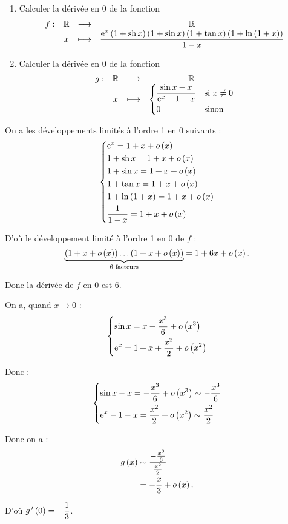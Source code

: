 \begin{exoex}
\begin{enumerate}
    \item Calculer la dérivée en \(0\) de la fonction \[\begin{array}[t]{cccc}f : & \mathbb{R} & \longrightarrow & \mathbb{R} \\ & x & \longmapsto & \dfrac{\mathrm{e}^{x}\left(1+\operatorname{sh} x\right)\left(1+\sin x\right)\left(1+\tan x\right)\left(1+\ln\left(1+x\right)\right)}{1-x}\end{array}\]
    \item Calculer la dérivée en \(0\) de la fonction \[\begin{array}[t]{cccc}g : & \mathbb{R} & \longrightarrow & \mathbb{R} \\ & x & \longmapsto & \begin{dcases}
        \dfrac{\sin x-x}{\mathrm{e}^{x}-1-x} &\text{si }x\not=0 \\
        0 &\text{sinon}
    \end{dcases}\end{array}\]
\end{enumerate}
\end{exoex}

\begin{corr}[1]
On a les développements limités à l'ordre 1 en \(0\) suivants : \[\begin{dcases}
\mathrm{e}^{x}=1+x+o\left(x\right) \\
1+\operatorname{sh} x=1+x+o\left(x\right) \\
1+\sin x=1+x+o\left(x\right) \\
1+\tan x=1+x+o\left(x\right) \\
1+\ln\left(1+x\right)=1+x+o\left(x\right) \\
\dfrac{1}{1-x}=1+x+o\left(x\right)
\end{dcases}\]

D'où le développement limité à l'ordre 1 en \(0\) de \(f\) : \[\underbrace{\left(1+x+o\left(x\right)\right)\dots\left(1+x+o\left(x\right)\right)}_{\text{6 facteurs}}=1+6x+o\left(x\right).\]

Donc la dérivée de \(f\) en \(0\) est \(6\).
\end{corr}

\begin{corr}[2]
On a, quand \(x\to0\) : \[\begin{dcases}
\sin x=x-\dfrac{x^3}{6}+o\left(x^3\right) \\
\mathrm{e}^{x}=1+x+\dfrac{x^2}{2}+o\left(x^2\right)
\end{dcases}\]

Donc : \[\begin{dcases}
\sin x-x=-\dfrac{x^3}{6}+o\left(x^3\right)\sim-\dfrac{x^3}{6} \\
\mathrm{e}^{x}-1-x=\dfrac{x^2}{2}+o\left(x^2\right)\sim\dfrac{x^2}{2}
\end{dcases}\]

Donc on a : \[\begin{aligned}
g\left(x\right)&\sim\dfrac{-\frac{x^3}{6}}{\frac{x^2}{2}} \\
&=-\dfrac{x}{3}+o\left(x\right).
\end{aligned}\]

D'où \(g^{\,\prime}\left(0\right)=-\dfrac{1}{3}\).
\end{corr}
